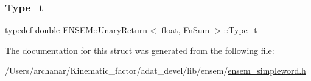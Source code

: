 \subsubsection{\texorpdfstring{Type\_t}{Type\_t}\hspace{0.1cm}{\footnotesize\ttfamily [2/2]}}
{\footnotesize\ttfamily typedef double \mbox{\hyperlink{structENSEM_1_1UnaryReturn}{E\+N\+S\+E\+M\+::\+Unary\+Return}}$<$ float, \mbox{\hyperlink{structENSEM_1_1FnSum}{Fn\+Sum}} $>$\+::\mbox{\hyperlink{structENSEM_1_1UnaryReturn_3_01float_00_01FnSum_01_4_a0cb79ec09e03be62cf6790bcbd3d89c3}{Type\+\_\+t}}}



The documentation for this struct was generated from the following file\+:\begin{DoxyCompactItemize}
\item 
/\+Users/archanar/\+Kinematic\+\_\+factor/adat\+\_\+devel/lib/ensem/\mbox{\hyperlink{lib_2ensem_2ensem__simpleword_8h}{ensem\+\_\+simpleword.\+h}}\end{DoxyCompactItemize}
